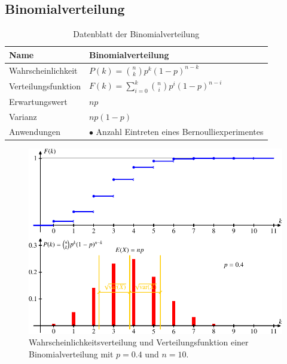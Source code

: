 %
%
%
\subsection{Binomialverteilung} \label{section-binomialverteilung}
\begin{table}
\renewcommand{\arraystretch}{1.5}
\begin{center}
\begin{tabular}{|l|l|}
\hline
Name&Binomialverteilung\\
\hline
Wahrscheinlichkeit&
\begin{minipage}{3.7in}
\vskip3pt
$\displaystyle P(k)=\binom{n}{k}p^k(1-p)^{n-k}$
\end{minipage}
\\[10pt]
Verteilungsfunktion&
$\displaystyle F(k)=\sum_{i=0}^k\binom{n}{i}p^i(1-p)^{n-i}$
\\[10pt]
Erwartungswert&$\displaystyle np$\\
Varianz&$\displaystyle np(1-p)$\\
\hline
Anwendungen&\begin{minipage}{3.7in}%
\strut
$\bullet$ Anzahl Eintreten eines Bernoulliexperimentes
\strut
\end{minipage}\\
\hline
\end{tabular}
\end{center}
\caption{Datenblatt der Binomialverteilung\label{datenblatt:binomialverteilung}}
\end{table}
\begin{figure}
\centering
\includegraphics{images/gl-3.pdf}
\caption{Wahrscheinlichkeitsverteilung und Verteilungsfunktion einer
Binomialverteilung mit $p=0.4$ und $n=10$.
\label{binomialgraph}}
\end{figure}


